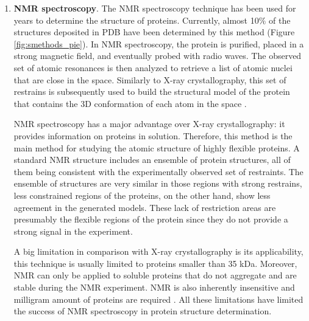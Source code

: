 \documentclass[12pt, b5paper,twoside]{tesi_upf}
\begin{document}
\begin{enumerate}[label=(\alph*)]
\item \textbf{NMR spectroscopy}. The NMR spectroscopy technique has been used for years to determine the structure of proteins. Currently, almost 10$\%$ of the structures deposited in PDB have been determined by this method (Figure \ref{fig:smethods_pie}). In NMR spectroscopy, the protein is purified, placed in a strong magnetic field, and eventually probed with radio waves. The observed set of atomic resonances is then analyzed to retrieve a list of atomic nuclei that are close in the space. Similarly to X-ray crystallography, this set of restrains is subsequently used to build the structural model of the protein that contains the 3D conformation of each atom in the space \cite{Wider2000}.   
\par NMR spectroscopy has a major advantage over X-ray crystallography: it provides information on proteins in solution. Therefore, this method is the main method for studying the atomic structure of highly flexible proteins. A standard NMR structure includes an ensemble of protein structures, all of them being consistent with the experimentally observed set of restraints. The ensemble of structures are very similar in those regions with strong restrains, less constrained regions of the proteins, on the other hand, show less agreement in the generated models. These lack of restriction areas are presumably the flexible regions of the protein since they do not provide a strong signal in the experiment.   
\par A big limitation in comparison with X-ray crystallography is its applicability, this technique is usually limited to proteins smaller than 35 kDa. Moreover, NMR can only be applied to soluble proteins that do not aggregate and are stable during the NMR experiment. NMR is also inherently insensitive and milligram amount of proteins are required \cite{Wider2000}. All these limitations have limited the success of NMR spectroscopy in protein structure determination.


\end{enumerate}
\end{document}

